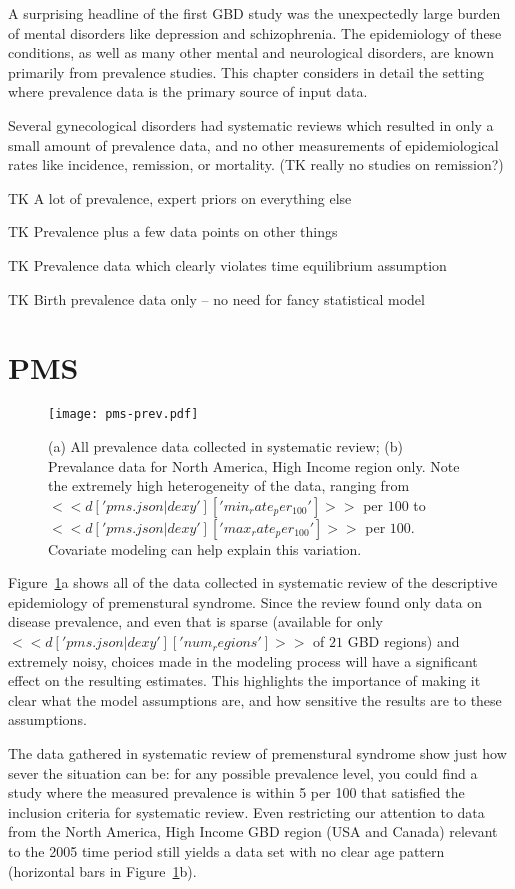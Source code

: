A surprising headline of the first GBD study was the unexpectedly
large burden of mental disorders like depression and
schizophrenia. The epidemiology of these conditions, as well as many
other mental and neurological disorders, are known primarily from
prevalence studies. This chapter considers in detail the setting where
prevalence data is the primary source of input data.

Several gynecological disorders had systematic reviews which resulted
in only a small amount of prevalence data, and no other measurements
of epidemiological rates like incidence, remission, or mortality.  (TK
really no studies on remission?)

TK A lot of prevalence, expert priors on everything else

TK Prevalence plus a few data points on other things

TK Prevalence data which clearly violates time equilibrium assumption

TK Birth prevalence data only -- no need for fancy statistical model

\section{PMS}
\begin{figure}
\begin{center}
\texttt{[image: pms-prev.pdf]}
\end{center}
\caption{(a) All prevalence data collected in systematic review; (b)
  Prevalance data for North America, High Income region only.  Note
  the extremely high heterogeneity of the data, ranging from
  $<<d['pms.json|dexy']['min_rate_per_100']>>$ per $100$ to
  $<<d['pms.json|dexy']['max_rate_per_100']>>$ per $100$.  Covariate
  modeling can help explain this variation.}
\label{pms-prev}
\end{figure}

Figure~\ref{pms-prev}a shows all of the data collected in systematic
review of the descriptive epidemiology of premenstural syndrome.
Since the review found only data on disease prevalence, and even that
is sparse (available for only $<<d['pms.json|dexy']['num_regions']>>$
of $21$ GBD regions) and extremely noisy, choices made in the modeling
process will have a significant effect on the resulting estimates.
This highlights the importance of making it clear what the model assumptions
are, and how sensitive the results are to these assumptions.

The data gathered in systematic review of premenstural syndrome show
just how sever the situation can be: for any possible prevalence
level, you could find a study where the measured prevalence is within
5 per 100 that satisfied the inclusion criteria for systematic review.
Even restricting our attention to data from the North America, High
Income GBD region (USA and Canada) relevant to the 2005 time period
still yields a data set with no clear age pattern (horizontal bars in
Figure~\ref{pms-prev}b).

